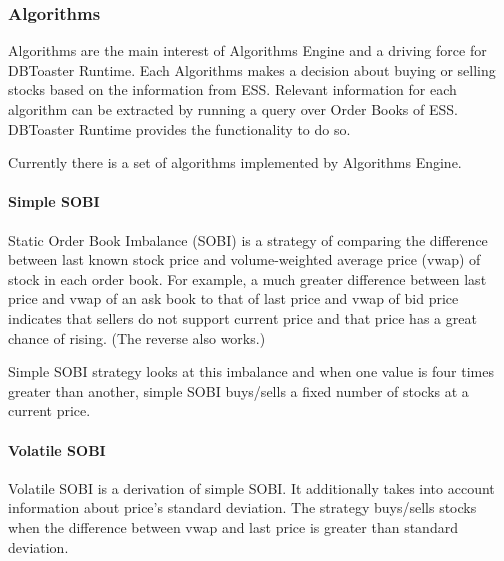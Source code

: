 \documentclass[14pt]{article}
\begin{document}


\subsubsection{Algorithms}

Algorithms are the main interest of Algorithms Engine and a driving force for DBToaster Runtime. Each Algorithms makes a decision about buying or selling stocks based on the information from ESS. Relevant information for each algorithm can be extracted by running a query over Order Books of ESS. DBToaster Runtime provides the functionality to do so. 

Currently there is a set of algorithms implemented by Algorithms Engine. 

\paragraph{Simple SOBI}

Static Order Book Imbalance (SOBI) is a strategy of comparing the difference between last known stock price and volume-weighted average price (vwap) of stock in each order book. For example, a much greater difference between last price and vwap of an ask book to that of last price and vwap of bid price indicates that sellers do not support current price and that price has a great chance of rising. (The reverse also works.)

Simple SOBI strategy looks at this imbalance and when one value is four times greater than another, simple SOBI buys/sells a fixed number of stocks at a current price.

\paragraph{Volatile SOBI}

Volatile SOBI is a derivation of simple SOBI. It additionally takes into account information about price's standard deviation. The strategy buys/sells stocks when the difference between vwap and last price is greater than standard deviation.
\end{document}
